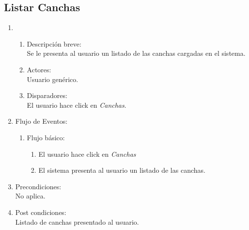 \documentclass[a4paper,11pt]{article}
\begin{document}
\subsection{Listar Canchas}
\begin{enumerate}
    \item
    \begin{enumerate}
		\item Descripci\'on breve: \\
        		Se le presenta al usuario un listado de las canchas cargadas en el sistema.
    		\item Actores: \\
        		Usuario gen\'erico.
    		\item Disparadores: \\
        		El usuario hace click en \emph{Canchas}.
    \end{enumerate}
    \item Flujo de Eventos:
		\begin{enumerate}
		\item Flujo b\'asico:
        		\begin{enumerate}
            			\item El usuario hace click en \emph{Canchas}
            			\item El sistema presenta al usuario un listado de las canchas.
        		\end{enumerate}
    		\end{enumerate}
    \item Precondiciones: \\
        No aplica.
    \item Post condiciones: \\
        Listado de canchas presentado al usuario.
\end{enumerate}

\end{document}
